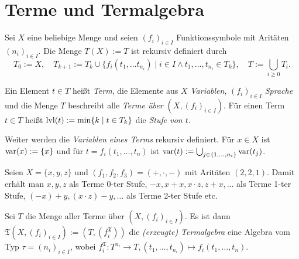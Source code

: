 \section{Terme und Termalgebra}

\begin{definition}
    Sei $X$ eine beliebige Menge und seien $(f_i)_{i \in I}$ Funktionssymbole mit Aritäten $(n_i)_{i \in I}$. Die Menge $T(X) := T$ ist rekursiv definiert durch $$T_0 := X ,\quad T_{k+1} := T_k \cup \{f_i(t_1, \ldots t_{n_i}) \mid i \in I \land t_1, \ldots, t_{n_i} \in T_k\},\quad T := \bigcup_{i \ge 0} T_i.$$ 
    
    Ein Element $t \in T$ heißt \emph{Term}, die Elemente aus $X$ \emph{Variablen}, $(f_i)_{i \in I}$ \emph{Sprache} und die Menge $T$ beschreibt alle \emph{Terme über $(X, (f_i)_{i \in I})$}.
    Für einen Term $t \in T$ heißt $\operatorname{lvl}(t) := \min\{k \mid t \in T_k\}$ die \emph{Stufe von $t$}. 
    
    Weiter werden die \emph{Variablen eines Terms} rekursiv definiert. Für $x \in X$ ist $\operatorname{var}(x) := \{x\}$ und für $t = f_i(t_1, \ldots, t_n)$ ist $\operatorname{var}(t) := \bigcup_{j \in \{1, \ldots, n_i\}} \operatorname{var}(t_j)$.
\end{definition}

\begin{example}
    Seien $X = \{x,y,z\}$ und $(f_1, f_2, f_3) = (+, \cdot, -)$ mit Aritäten $(2,2,1)$. Damit erhält man $x,y,z$ als Terme 0-ter Stufe, $-x, x+x, x\cdot z, z + x, \ldots$ als Terme 1-ter Stufe, $(-x) + y, (x \cdot z) - y, \ldots$ als Terme 2-ter Stufe etc.
\end{example}

\begin{definition}
    Sei $T$ die Menge aller Terme über $(X, (f_i)_{i \in I})$. Es ist dann $\mathfrak{T}(X, (f_i)_{i \in I}) := (T, (f_i^\mathfrak{T}))$ die \emph{(erzeugte) Termalgebra} eine Algebra vom Typ $\tau = (n_i)_{i \in I}$, wobei $f_i^\mathfrak{T}: T^{n_i} \to T, (t_1, \ldots, t_{n_i}) \mapsto f_i(t_1, \ldots, t_n)$.
\end{definition}

